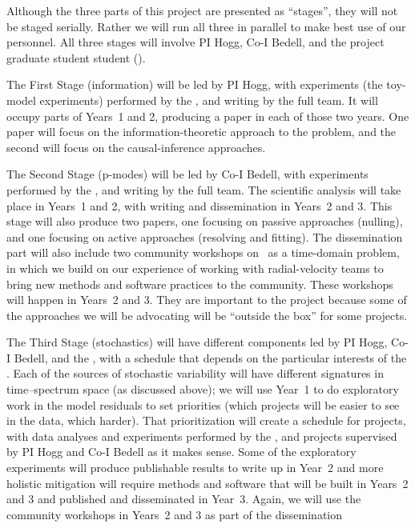 \documentclass[12pt, letterpaper]{article}
\begin{document}

Although the three parts of this project are presented as ``stages'',
they will not be staged serially.
Rather we will run all three in parallel to make best use of our
personnel.
All three stages will involve PI Hogg, Co-I Bedell, and the project
graduate student student (\GRA). 

The First Stage (information) will be led by PI Hogg, with experiments (the
toy-model experiments) performed by the \GRA, and writing by the full
team.
It will occupy parts of Years~1 and 2, producing a paper
in each of those two years.
One paper will focus on the information-theoretic approach to the problem,
and the second will focus on the causal-inference approaches.

The Second Stage (p-modes) will be led by Co-I Bedell, with
experiments performed by the \GRA, and writing by the full team.
The scientific analysis will take place in Years~1 and 2, with
writing and dissemination in Years~2 and 3.
This stage will also produce two papers, one focusing on passive
approaches (nulling), and one focusing on active approaches (resolving
and fitting).
The dissemination part will also include two community workshops on
\EPRV\ as a time-domain problem, in which we build on our experience
of working with radial-velocity teams to bring new methods and
software practices to the community.
These workshops will happen in Years~2 and 3.
They are important to the project because some of the approaches we
will be advocating will be ``outside the box'' for some projects.

The Third Stage (stochastics) will have different components led by PI
Hogg, Co-I Bedell, and the \GRA, with a schedule that depends on the
particular interests of the \GRA.
Each of the sources of stochastic variability will have different
signatures in time--spectrum space (as discussed above); we will use
Year~1 to do exploratory work in the model residuals to set priorities
(which projects will be easier to see in the data, which harder).
That prioritization will create a schedule for projects, with data
analyses and experiments performed by the \GRA, and projects supervised
by PI Hogg and Co-I Bedell as it makes sense.
Some of the exploratory experiments will produce publishable results
to write up in Year~2 and more holistic mitigation will require
methods and software that will be built in Years~2 and 3 and published
and disseminated in Year~3.
Again, we will use the community workshops in Years~2 and 3 as part of
the dissemination
\end{document}
